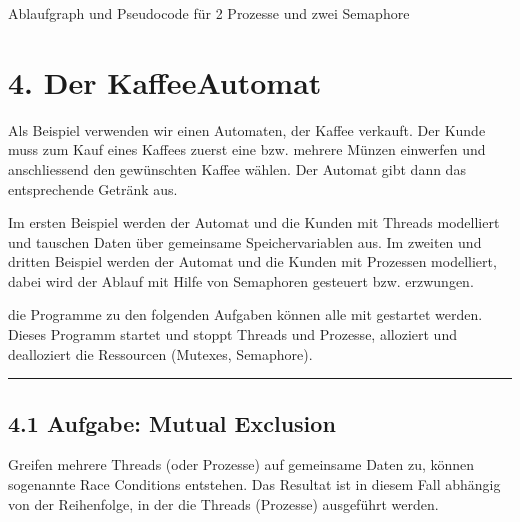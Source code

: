 \documentclass[a4paper,10pt,english]{report}
\begin{document}
\sphinxAtStartPar
{}

\begin{sphinxVerbatim}[commandchars=\\\{\}]
    
  
\end{sphinxVerbatim}

\sphinxAtStartPar
Ablaufgraph und Pseudocode für 2 Prozesse und zwei Semaphore\\


\section{4. Der Kaffee\sphinxhyphen{}Automat}
\label{\detokenize{P08_Sync/README:der-kaffee-automat}}
\sphinxAtStartPar
Als Beispiel verwenden wir einen Automaten, der Kaffee verkauft. Der Kunde muss zum Kauf eines Kaffees zuerst eine bzw. mehrere Münzen einwerfen und anschliessend den gewünsch\sphinxhyphen{}ten Kaffee wählen. Der Automat gibt dann das entsprechende Getränk aus.

\sphinxAtStartPar
Im ersten Beispiel werden der Automat und die Kunden mit Threads modelliert und tauschen Daten über gemeinsame Speichervariablen aus. Im zweiten und dritten Beispiel werden der Automat und die Kunden mit Prozessen modelliert, dabei wird der Ablauf mit Hilfe von Sema\sphinxhyphen{}phoren gesteuert bzw. erzwungen.

\sphinxAtStartPar
{} die Programme zu den folgenden Aufgaben können alle mit  gestartet werden. Dieses Programm startet und stoppt Threads und Prozesse, alloziert und dealloziert die Ressourcen (Mutexes, Semaphore).


\bigskip\hrule\bigskip



\subsection{4.1 Aufgabe: Mutual Exclusion}
\label{\detokenize{P08_Sync/README:aufgabe-mutual-exclusion}}
\sphinxAtStartPar
Greifen mehrere Threads (oder Prozesse) auf gemeinsame Daten zu, können sogenannte Race Conditions entstehen. Das Resultat ist in diesem Fall abhängig von der Reihenfolge, in der die Threads (Prozesse) ausgeführt werden.
\end{document}
